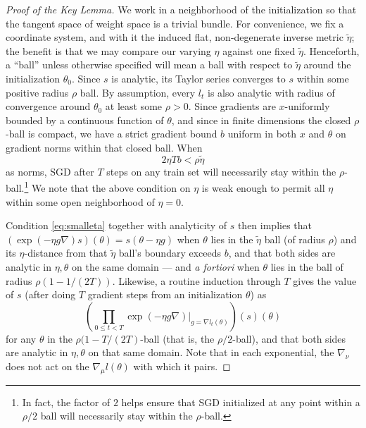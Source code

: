 \documentclass{article}
\theoremstyle{plain}
\theoremstyle{definition}
\newcommand{\wrap}[1]{\left(#1\right)}
\begin{document}
        \begin{proof}[Proof of the Key Lemma]%
            We work in a neighborhood of the initialization so that the tangent
            space of weight space is a trivial bundle.  For convenience, we fix
            a  coordinate system, and with it the induced flat,
            non-degenerate inverse metric $\tilde\eta$; the benefit is that we
            may compare our varying $\eta$ against one fixed $\tilde\eta$.
            Henceforth, a ``ball'' unless otherwise specified will mean a ball
            with respect to $\tilde\eta$ around the initialization $\theta_0$.
            Since $s$ is analytic, its Taylor series converges to $s$ within
            some positive radius $\rho$ ball.  By assumption, every $l_t$ is
            also analytic with radius of convergence around $\theta_0$ at least
            some $\rho>0$.  Since gradients are $x$-uniformly
            bounded by a continuous function of $\theta$, and since in finite
            dimensions the closed $\rho$-ball is compact, we have a strict
            gradient bound $b$ uniform in both $x$ and $\theta$ on gradient
            norms within that closed ball.  When
            \begin{equation} \label{eq:smalleta}
                2 \eta T b < \rho \tilde\eta
            \end{equation}
            as norms, SGD after $T$ steps on any train set
            will necessarily stay within the $\rho$-ball.\footnote{
                In fact, the factor of $2$ helps ensure that SGD initialized at
                any point within a $\rho/2$ ball will necessarily stay within
                the $\rho$-ball.
            } We note that the above condition on $\eta$ is weak enough to
            permit all $\eta$ within some open neighborhood of $\eta=0$.  

            Condition \ref{eq:smalleta} together with analyticity of $s$ then
            implies that
            $
                \wrap{\exp(-\eta g \nabla) s}(\theta) = s(\theta - \eta g)
            $
            when $\theta$ lies in the $\tilde\eta$ ball (of radius $\rho$) and
            its $\eta$-distance from that $\tilde\eta$ ball's boundary exceeds
            $b$, and that both sides are analytic in $\eta, \theta$ on the same
            domain --- and \emph{a fortiori} when $\theta$ lies in the ball of
            radius $\rho (1 - 1/(2T))$.  Likewise, a routine induction through
            $T$ gives the value of $s$ (after doing $T$ gradient steps from an
            initialization $\theta$) as
            $$
                \wrap{
                    \prod_{0\leq t<T}
                        \left.
                            \exp(-\eta g \nabla)
                        \right|_{g=\nabla l_t(\theta)}
                }
                (s)(\theta)
            $$
            for any $\theta$ in the $\rho (1-T/(2T)$-ball (that is, the
            $\rho/2$-ball), and that both sides are analytic in $\eta, \theta$
            on that same domain.  Note that in each exponential, the
            $\nabla_\nu$ does not act on the $\nabla_\mu l(\theta)$ with which
            it pairs.  


\end{proof}
\end{document}
